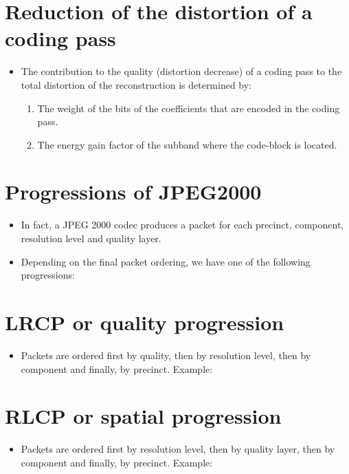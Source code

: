 \section*{Reduction of the distortion of a coding pass}
\begin{itemize}
\item The contribution to the quality (distortion decrease) of a
  coding pass to the total distortion of the reconstruction is
  determined by:
  \begin{enumerate}
  \item The weight of the bits of the coefficients that are encoded in
    the coding pass.
  \item The energy gain factor of the subband where the code-block is
    located.
  \end{enumerate}
\end{itemize}

\section*{Progressions of JPEG2000}
\begin{itemize}
\item In fact, a JPEG 2000 codec produces a packet for each precinct,
  component, resolution level and quality layer.
\item Depending on the final packet ordering, we have one of the
  following progressions:
\end{itemize}

\section*{LRCP or quality progression}
\begin{itemize}
\item Packets are ordered first by quality, then by resolution level,
  then by component and finally, by precinct. Example:
\end{itemize}
\begin{center}
\end{center}

\section*{RLCP or spatial progression}
\begin{itemize}
\item Packets are ordered first by resolution level, then by quality
  layer, then by component and finally, by precinct. Example:
\end{itemize}
\begin{center}
\end{center}

